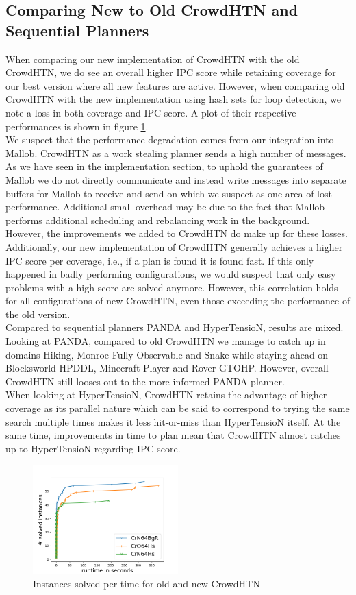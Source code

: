 \subsection{Comparing New to Old CrowdHTN and Sequential Planners}
\label{eval: old}
When comparing our new implementation of CrowdHTN with the old CrowdHTN, we do see an overall higher IPC score while retaining coverage for our best version where all new features are active. However, when comparing old CrowdHTN with the new implementation using hash sets for loop detection, we note a loss in both coverage and IPC score. A plot of their respective performances is shown in figure \ref{figure: eval old new}. \\
We suspect that the performance degradation comes from our integration into Mallob. CrowdHTN as a work stealing planner sends a high number of messages. As we have seen in the implementation section, to uphold the guarantees of Mallob we do not directly communicate and instead write messages into separate buffers for Mallob to receive and send on which we suspect as one area of lost performance. Additional small overhead may be due to the fact that Mallob performs additional scheduling and rebalancing work in the background.\\
However, the improvements we added to CrowdHTN do make up for these losses. Additionally, our new implementation of CrowdHTN generally achieves a higher IPC score per coverage, i.e., if a plan is found it is found fast. If this only happened in badly performing configurations, we would suspect that only easy problems with a high score are solved anymore. However, this correlation holds for all configurations of new CrowdHTN, even those exceeding the performance of the old version. \\
Compared to sequential planners PANDA and HyperTensioN, results are mixed.
Looking at PANDA, compared to old CrowdHTN we manage to catch up in domains Hiking, Monroe-Fully-Observable and Snake while staying ahead on Blocksworld-HPDDL, Minecraft-Player and Rover-GTOHP. However, overall CrowdHTN still looses out to the more informed PANDA planner. \\
When looking at HyperTensioN, CrowdHTN retains the advantage of higher coverage as its parallel nature which can be said to correspond to trying the same search multiple times makes it less hit-or-miss than HyperTensioN itself. At the same time, improvements in time to plan mean that CrowdHTN almost catches up to HyperTensioN regarding IPC score.
\begin{figure}[!hbp]
	\caption{Instances solved per time for old and new CrowdHTN}
	\label{figure: eval old new}
	\centering
	\includegraphics[width=0.5\textwidth]{images/final/old_new}
\end{figure}

